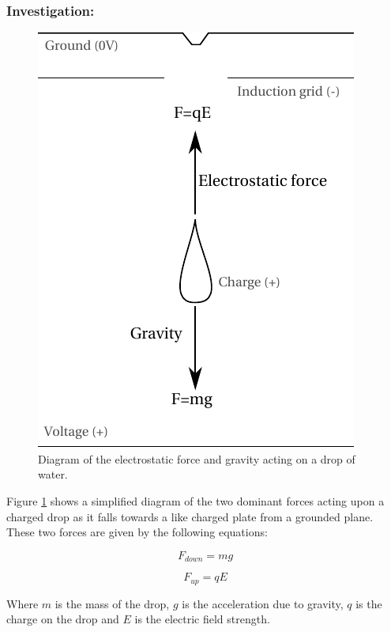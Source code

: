 \subsubsection*{Investigation:}

\begin{figure}
    \centering
    \includegraphics{content/appendices/chargedWaterDrops/graphics/ChargedDrips_Figure_Diagram_Forces}
    \caption{\label{Figure_Diagram_ChargedDrips_Figure_Diagram_Forces}Diagram
of the electrostatic force and gravity acting on a drop of water.}
\end{figure}


Figure \ref{Figure_Diagram_ChargedDrips_Figure_Diagram_Forces} shows
a simplified diagram of the two dominant forces acting upon a charged
drop as it falls towards a like charged plate from a grounded plane.
These two forces are given by the following equations:

\begin{equation}
F_{down}=mg
\end{equation}


\begin{equation}
F_{up}=qE
\end{equation}


Where $m$ is the mass of the drop, $g$ is the acceleration due to
gravity, $q$ is the charge on the drop and $E$ is the electric field
strength.
